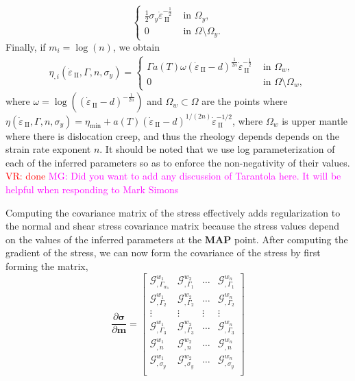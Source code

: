 \documentclass[12pt]{article}
\newcommand{\mgnote}[1]{\textcolor{magenta}{MG: #1}}
\newcommand{\vrnote}[1]{\textcolor{red}{VR: #1}}
\newcommand{\IIinv}{{\dot\varepsilon}_{\mathrm{\!\!\:II}}}
\newcommand{\mm}{{\ensuremath{\boldsymbol{m}}}}
\newcommand{\ssigma}{{\ensuremath{\boldsymbol{\sigma}}}}
\begin{document}
{\begin{equation*}
\begin{cases}
    \frac{1}{2}\sigma_y\IIinv^{-\frac{1}{2}} & \text{ in } \Omega_y,\\
    0                          & \text{ in } \Omega\setminus\Omega_y.
  \end{cases}
  \end{equation*}
Finally, if $m_i = \log(n)$, we obtain
\begin{align*}
  \eta_{,i}(\IIinv,\Gamma,n,\sigma_y) =
  \begin{cases}
    \Gamma a(T)\omega(\IIinv-d)^{\frac{1}{2n}}\IIinv^{-\frac{1}{2}} &
    \text{ in }\Omega_w,\\
    0 & \text{ in } \Omega\setminus\Omega_w,
  \end{cases}
  \end{align*}
where $\omega = \log((\IIinv-d)^{-\frac{1}{2n}})$ and
$\Omega_w\subset\Omega$ are the points where
$\eta(\IIinv,\Gamma,n,\sigma_y) = \eta_{\min} +
a(T)(\IIinv-d)^{1/(2n)}\IIinv^{-1/2}$, where $\Omega_w$ is upper mantle where there is dislocation creep, and thus the rheology depends depends
on the strain rate exponent $n$. It should be noted that we use log parameterization of each of the inferred parameters so as to enforce the non-negativity of their values. \vrnote{done} \mgnote{Did you want to add any discussion of Tarantola here. It will be helpful when responding to Mark Simons}

Computing the covariance matrix of the stress effectively adds regularization to the normal and shear stress covariance matrix because the stress values depend on the values of the inferred parameters at the \textbf{MAP} point. After computing the gradient of the stress, we can now form the covariance of the stress by first forming the matrix,
\begin{equation}
\frac{\partial \ssigma}{\partial \mm}=
  \begin{bmatrix}
    \mathcal G^{w_1}_{,\Gamma_{w_1}}  & \mathcal G^{w_2}_{,\Gamma_{1}} & \hdots & \mathcal G^{w_n}_{,\Gamma_{1}} \\
    \mathcal G^{w_1}_{,\Gamma_{2}} & \mathcal G^{w_2}_{,\Gamma_{2}}  &  \hdots & \mathcal G^{w_n}_{,\Gamma_{2}} \\
    \vdots & \vdots & \vdots & \vdots  \\
    \mathcal G^{w_1}_{,\Gamma_{3}} & \mathcal G^{w_2}_{,\Gamma_{3}} &   \hdots & \mathcal G^{w_n}_{,\Gamma_{3}} \\
    \mathcal G^{w_1}_{,n} & \mathcal G^{w_2}_{,n} &  \hdots & \mathcal G^{w_n}_{,n} \\
    \mathcal G^{w_1}_{,\sigma_y} & \mathcal G^{w_2}_{,\sigma_y} &  \hdots & \mathcal G^{w_n}_{,\sigma_y} \\


\end{bmatrix}
\end{equation}}
\end{document}
